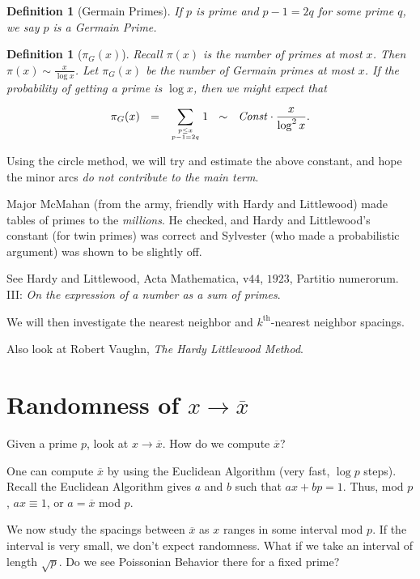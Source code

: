 \documentclass[12pt,letterpaper]{report}
\newcommand\be{\begin{equation}}
\newcommand\ee{\end{equation}}
\newtheorem{defi}[thm]{Definition}
\begin{document}
\begin{defi}[Germain Primes] If $p$ is prime and $p - 1 = 2q$ for
some prime $q$, we say $p$ is a Germain Prime. \end{defi}

\begin{defi}[$\pi_G(x)$] Recall $\pi(x)$ is the number of primes
at most $x$. Then $\pi(x) \sim \frac{x}{\log x}$. Let $\pi_G(x)$
be the number of Germain primes at most $x$. If the probability of
getting a prime is $\log x$, then we might expect that

\be \pi_G(x) \ \ = \ \ \sum_{ {p \le x \atop p - 1 = 2q} } 1 \ \
\sim \ \ \text{\emph{Const}} \cdot \frac{x}{\log^2 x}. \ee

\end{defi}

Using the circle method, we will try and estimate the above
constant, and hope the minor arcs \emph{do not contribute to the
main term}.

Major McMahan (from the army, friendly with Hardy and Littlewood)
made tables of primes to the \emph{millions}. He checked, and
Hardy and Littlewood's constant (for twin primes) was correct and
Sylvester (who made a probabilistic argument) was shown to be
slightly off.

See Hardy and Littlewood, Acta Mathematica, v$44$, $1923$,
Partitio numerorum. III: \emph{On the expression of a number as a
sum of primes}.

We will then investigate the nearest neighbor and
$k^{\text{th}}$-nearest neighbor spacings.

Also look at Robert Vaughn, \emph{The Hardy Littlewood Method}.


\section{Randomness of $x \to \overline{x}$}

Given a prime $p$, look at $x \to \overline{x}$. How do we compute
$\overline{x}$?

One can compute $\overline{x}$ by using the Euclidean Algorithm
(very fast, $\log p$ steps). Recall the Euclidean Algorithm gives
$a$ and $b$ such that $ax + bp = 1$. Thus, mod $p$, $ax \equiv 1$,
or $a = \overline{x}$ mod $p$.

We now study the spacings between $\overline{x}$ as $x$ ranges in
some interval mod $p$. If the interval is very small, we don't
expect randomness. What if we take an interval of length
$\sqrt{p}$. Do we see Poissonian Behavior there for a fixed prime?
\end{document}
